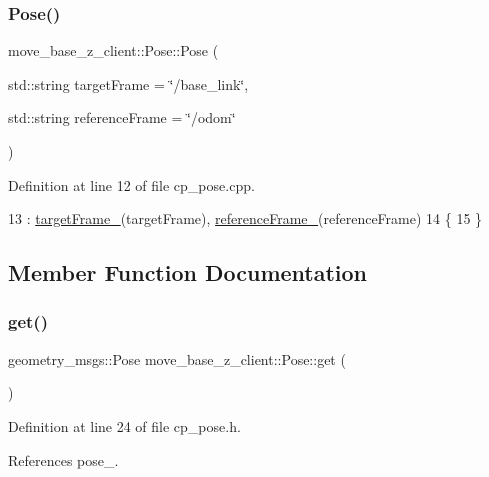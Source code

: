 \subsubsection{\texorpdfstring{Pose()}{Pose()}}
{\footnotesize\ttfamily move\+\_\+base\+\_\+z\+\_\+client\+::\+Pose\+::\+Pose (\begin{DoxyParamCaption}\item[{std\+::string}]{target\+Frame = {\ttfamily \char`\"{}/base\+\_\+link\char`\"{}},  }\item[{std\+::string}]{reference\+Frame = {\ttfamily \char`\"{}/odom\char`\"{}} }\end{DoxyParamCaption})}



Definition at line 12 of file cp\+\_\+pose.\+cpp.


\begin{DoxyCode}
13     : \hyperlink{classmove__base__z__client_1_1Pose_a268cfb00a32306e9f8ec80479addda9e}{targetFrame\_}(targetFrame), \hyperlink{classmove__base__z__client_1_1Pose_a38e1a906cb238d648e46bf7e8fa72fd8}{referenceFrame\_}(referenceFrame)
14 \{
15 \}
\end{DoxyCode}


\subsection{Member Function Documentation}
\mbox{\label{classmove__base__z__client_1_1Pose_aff06e2c3d38159f35829fb9285a110b6}} 
\subsubsection{\texorpdfstring{get()}{get()}}
{\footnotesize\ttfamily geometry\+\_\+msgs\+::\+Pose move\+\_\+base\+\_\+z\+\_\+client\+::\+Pose\+::get (\begin{DoxyParamCaption}{ }\end{DoxyParamCaption})\hspace{0.3cm}{\ttfamily [inline]}}



Definition at line 24 of file cp\+\_\+pose.\+h.



References pose\+\_\+.


